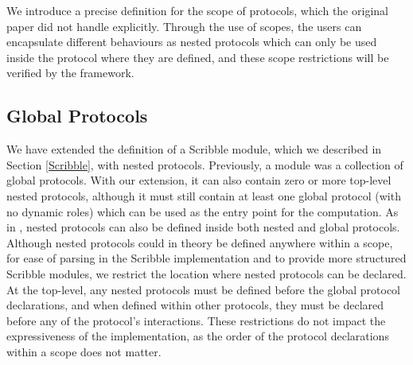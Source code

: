\documentclass[12pt,twoside]{report}
\begin{document}
We introduce a precise definition for the scope of protocols, which the original paper\cite{nestedprotocols} did not handle explicitly. Through the use of scopes, the users can encapsulate different behaviours as nested protocols which can only be used inside the protocol where they are defined, and these scope restrictions will be verified by the framework.\\

\subsection{Global Protocols}\label{scr-global-protocols}

We have extended the definition of a Scribble module, which we described in Section \ref{Scribble}, with nested protocols. Previously, a module was a collection of global protocols. With our extension, it can also contain zero or more top-level nested protocols, although it must still contain at least one global protocol (with no dynamic roles) which can be used as the entry point for the computation. As in \cite{nestedprotocols}, nested protocols can also be defined inside both nested and global protocols.\\

Although nested protocols could in theory be defined anywhere within a scope, for ease of parsing in the Scribble implementation and to provide more structured Scribble modules, we restrict the location where nested protocols can be declared. At the top-level, any nested protocols must be defined before the global protocol declarations, and when defined within other protocols, they must be declared before any of the protocol's interactions. These restrictions do not impact the expressiveness of the implementation, as the order of the protocol declarations within a scope does not matter.
\end{document}
